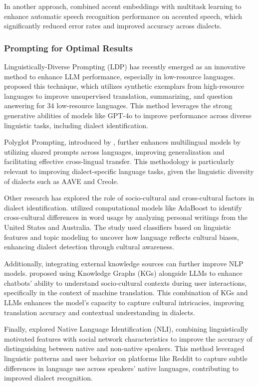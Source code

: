 In another approach, \cite{Jain:18} combined accent embeddings with multitask learning to enhance automatic speech recognition performance on accented speech, which significantly reduced error rates and improved accuracy across dialects.

\subsubsection{Prompting for Optimal Results}

Linguistically-Diverse Prompting (LDP) has recently emerged as an innovative method to enhance LLM performance, especially in low-resource languages. \cite{Nguyen:24} proposed this technique, which utilizes synthetic exemplars from high-resource languages to improve unsupervised translation, summarizing, and question answering for 34 low-resource languages. This method leverages the strong generative abilities of models like GPT-4o to improve performance across diverse linguistic tasks, including dialect identification.

Polyglot Prompting, introduced by \cite{Ng:22}, further enhances multilingual models by utilizing shared prompts across languages, improving generalization and facilitating effective cross-lingual transfer. This methodology is particularly relevant to improving dialect-specific language tasks, given the linguistic diversity of dialects such as AAVE and Creole.

Other research has explored the role of socio-cultural and cross-cultural factors in dialect identification. \cite{Garimella:16} utilized computational models like AdaBoost to identify cross-cultural differences in word usage by analyzing personal writings from the United States and Australia. The study used classifiers based on linguistic features and topic modeling to uncover how language reflects cultural biases, enhancing dialect detection through cultural awareness.

Additionally, integrating external knowledge sources can further improve NLP models. \cite{Camboim:24} proposed using Knowledge Graphs (KGs) alongside LLMs to enhance chatbots' ability to understand socio-cultural contexts during user interactions, specifically in the context of machine translation. This combination of KGs and LLMs enhances the model's capacity to capture cultural intricacies, improving translation accuracy and contextual understanding in dialects.

Finally, \cite{Goldin:18} explored Native Language Identification (NLI), combining linguistically motivated features with social network characteristics to improve the accuracy of distinguishing between native and non-native speakers. This method leveraged linguistic patterns and user behavior on platforms like Reddit to capture subtle differences in language use across speakers' native languages, contributing to improved dialect recognition.

